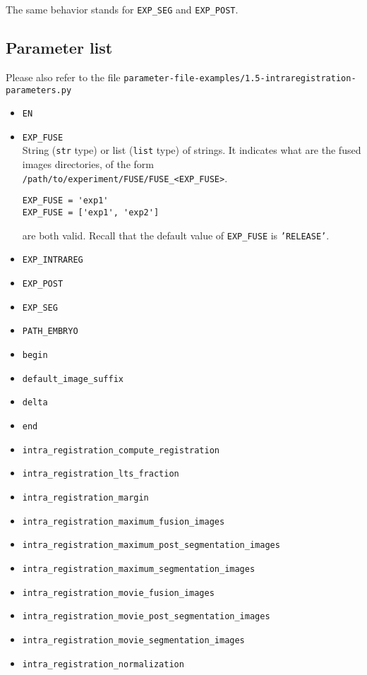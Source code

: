 The same behavior stands for \texttt{EXP\_SEG} and  \texttt{EXP\_POST}.


\subsection{Parameter list}

Please also refer to the file
\texttt{parameter-file-examples/1.5-intraregistration-parameters.py}

\begin{itemize}
\itemsep -1ex
\item \texttt{EN}
\item \texttt{EXP\_FUSE} \\
  String (\texttt{str} type) or list (\texttt{list} type) of
  strings. It indicates what are the fused images directories, of the form
  \texttt{/path/to/experiment/FUSE/FUSE\_<EXP\_FUSE>}.
\begin{verbatim}
EXP_FUSE = 'exp1'
EXP_FUSE = ['exp1', 'exp2']
\end{verbatim}
  are both valid. Recall that the default value of \texttt{EXP\_FUSE}
  is \texttt{'RELEASE'}.
\item \texttt{EXP\_INTRAREG}
\item \texttt{EXP\_POST}
\item \texttt{EXP\_SEG}
\item \texttt{PATH\_EMBRYO}
\item \texttt{begin}
\item \texttt{default\_image\_suffix}
\item \texttt{delta}
\item \texttt{end}
\item \texttt{intra\_registration\_compute\_registration}
\item \texttt{intra\_registration\_lts\_fraction}
\item \texttt{intra\_registration\_margin}
\item \texttt{intra\_registration\_maximum\_fusion\_images}
\item \texttt{intra\_registration\_maximum\_post\_segmentation\_images}
\item \texttt{intra\_registration\_maximum\_segmentation\_images}
\item \texttt{intra\_registration\_movie\_fusion\_images}
\item \texttt{intra\_registration\_movie\_post\_segmentation\_images}
\item \texttt{intra\_registration\_movie\_segmentation\_images}
\item \texttt{intra\_registration\_normalization}

\end{itemize}
